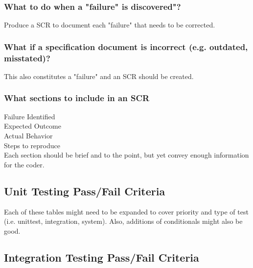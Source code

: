 \documentclass[report]{article}
\begin{document}
\subsubsection{What to do when a "failure" is discovered"?}
Produce a SCR to document each "failure" that needs to be corrected.

\subsubsection{What if a specification document is incorrect (e.g. outdated, misstated)?}
This also constitutes a "failure" and an SCR should be created.

\subsubsection{What sections to include in an SCR}

Failure Identified\\
Expected Outcome \\
Actual Behavior \\
Steps to reproduce \\

Each section should be brief and to the point, but yet convey enough information for the coder.

\subsection{Unit Testing Pass/Fail Criteria}
Each of these tables might need to be expanded to cover priority and type of test (i.e. unittest, integration, system). Also, additions of conditionals might also be good.

%

\newpage

\subsection{Integration Testing Pass/Fail Criteria}

%
%
%
%
%
%
%
%
%
%

\end{document}

